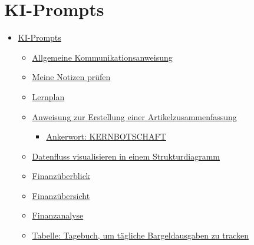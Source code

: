 \documentclass{vorlage-design-main}
\title{}
\author{Jan Unger}
\date{\today}
\begin{document}
\maketitle

\begin{abstract}



\end{abstract}

\section{KI-Prompts}\label{ki-prompts}

\begin{itemize}

\item
  \hyperref[ki-prompts]{KI-Prompts}

  \begin{itemize}

  \item
    \hyperref[allgemeine-kommunikationsanweisung]{Allgemeine
    Kommunikationsanweisung}
  \item
    \hyperref[meine-notizen-pruxfcfen]{Meine Notizen prüfen}
  \item
    \hyperref[lernplan]{Lernplan}
  \item
    \hyperref[anweisung-zur-erstellung-einer-artikelzusammenfassung]{Anweisung
    zur Erstellung einer Artikelzusammenfassung}

    \begin{itemize}

    \item
      \hyperref[ankerwort-kernbotschaft]{Ankerwort: KERNBOTSCHAFT}
    \end{itemize}
  \item
    \hyperref[datenfluss-visualisieren-in-einem-strukturdiagramm]{Datenfluss
    visualisieren in einem Strukturdiagramm}
  \item
    \hyperref[finanzuxfcberblick]{Finanzüberblick}
  \item
    \hyperref[finanzuxfcbersicht]{Finanzübersicht}
  \item
    \hyperref[finanzanalyse]{Finanzanalyse}
  \item
    \hyperref[tabelle-tagebuch-um-tuxe4gliche-bargeldausgaben-zu-tracken]{Tabelle:
    Tagebuch, um tägliche Bargeldausgaben zu tracken}
  \end{itemize}
\end{itemize}
\end{document}
